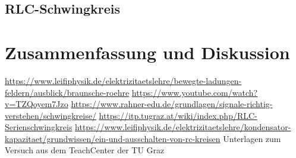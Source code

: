 \documentclass{article}
\begin{document}
\subsection{RLC-Schwingkreis}



\section{Zusammenfassung und Diskussion}







%

%


%


\begin{thebibliography}{9}
 \url{https://www.leifiphysik.de/elektrizitaetslehre/bewegte-ladungen-feldern/ausblick/braunsche-roehre}
 \url{https://www.youtube.com/watch?v=TZQoyem7Jzo}
 \url{https://www.rahner-edu.de/grundlagen/signale-richtig-verstehen/schwingkreise/}
 \url{https://itp.tugraz.at/wiki/index.php/RLC-Serienschwingkreis}
 \url{https://www.leifiphysik.de/elektrizitaetslehre/kondensator-kapazitaet/grundwissen/ein-und-ausschalten-von-rc-kreisen}
 Unterlagen zum Versuch aus dem TeachCenter der TU Graz

\end{thebibliography}
\end{document}
